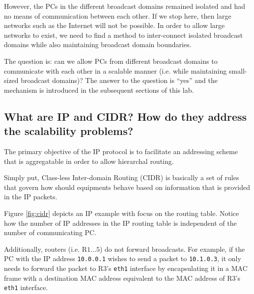 \documentclass[pdftex,12pt,a4paper]{article}
\begin{document}
                However, the PCs in the different broadcast domains remained
                isolated and had no means of communication between each other.
                If we stop here, then large networks such as the Internet will
                not be possible. In order to allow large networks to exist, we
                need to find a method to inter-connect isolated broadcast
                domains while also maintaining broadcast domain boundaries.

                The question is: can we allow PCs from different broadcast
                domains to communicate with each other in a scalable manner
                (i.e. while maintaining small-sized broadcast domains)? The
                answer to the question is ``yes'' and the mechanism is
                introduced in the subsequent sections of this lab.

        \subsection{What are IP and CIDR? How do they address the
        scalability problems?}
            The primary objective of the IP protocol is to facilitate an
            addressing scheme that is aggregatable in order to allow
            hierarchal routing.

            Simply put, Class-less Inter-domain Routing (CIDR) is basically a set of rules
            that govern how should equipments behave based on information that
            is provided in the IP packets.

            Figure \ref{fig:cidr} depicts an IP example with focus on the
            routing table. Notice how the number of IP addresses in the IP
            routing table is independent of the number of communicating
            PC.

            Additionally, routers (i.e. R$1\ldots5$) do not forward broadcasts.
            For example, if the PC with the IP address \texttt{10.0.0.1} wishes
            to send a packet to \texttt{10.1.0.3}, it only needs to forward the
            packet to R3's \texttt{eth1} interface by encapsulating it in a MAC frame
            with a destination MAC address equivalent to the MAC address of
            R3's \texttt{eth1} interface.
\end{document}
